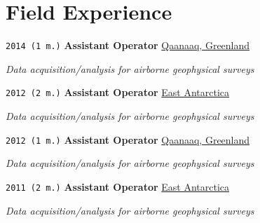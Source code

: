 \section*{Field Experience}

\TabPositions{7em,33em}

\noindent \texttt{2014 (1 m.)} \tab \textbf{Assistant Operator} \tab \href{https://en.wikipedia.org/wiki/Qaanaaq}{Qaanaaq, Greenland}
\begin{adjustwidth}{7em}{}
\textit{Data acquisition/analysis for airborne geophysical surveys}
\end{adjustwidth}
\vspace{1em}

\noindent \texttt{2012 (2 m.)} \tab \textbf{Assistant Operator} \tab \href{https://en.wikipedia.org/wiki/East_Antarctic_Ice_Sheet}{East Antarctica}
\begin{adjustwidth}{7em}{}
\textit{Data acquisition/analysis for airborne geophysical surveys}
\end{adjustwidth}
\vspace{1em}

\noindent \texttt{2012 (1 m.)} \tab \textbf{Assistant Operator} \tab \href{https://en.wikipedia.org/wiki/Qaanaaq}{Qaanaaq, Greenland}
\begin{adjustwidth}{7em}{}
\textit{Data acquisition/analysis for airborne geophysical surveys}
\end{adjustwidth}
\vspace{1em}

\noindent \texttt{2011 (2 m.)} \tab \textbf{Assistant Operator} \tab \href{https://en.wikipedia.org/wiki/East_Antarctic_Ice_Sheet}{East Antarctica}
\begin{adjustwidth}{7em}{}
\textit{Data acquisition/analysis for airborne geophysical surveys}
\end{adjustwidth}